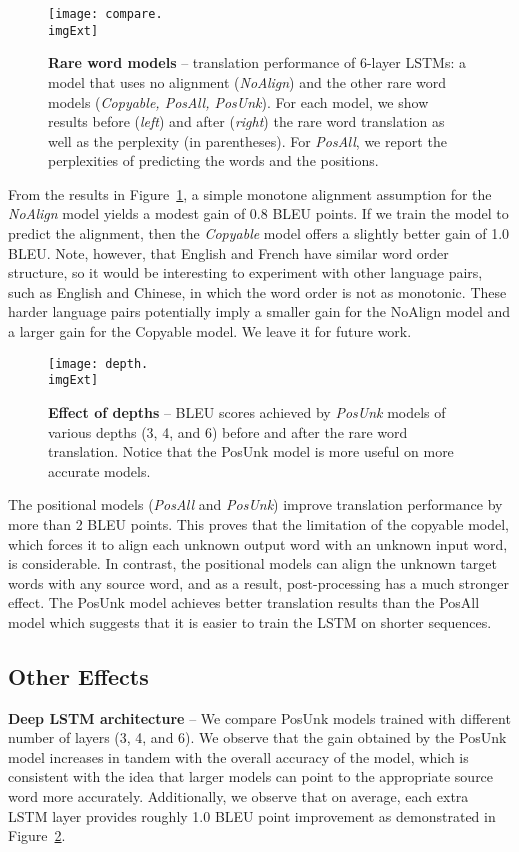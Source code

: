 \documentclass[11pt]{article}
\begin{document}
\begin{figure}
\centering
\texttt{[image: compare.\\imgExt]} \caption{{\bf Rare word models} -- 
translation performance of 6-layer LSTMs:
a model that uses no alignment ({\it NoAlign}) 
and the other rare word models ({\it Copyable, PosAll, PosUnk}). 
For each model, we show results before ({\it left}) and after ({\it right}) the rare word translation as well as the perplexity (in parentheses).
For {\it PosAll}, we report the perplexities of predicting the words and the positions.} 
\label{f:compare}
\end{figure}

 
From the results in Figure~\ref{f:compare}, a simple monotone
alignment assumption for the {\it NoAlign} model yields a modest gain of
0.8 BLEU points. If we train the model to predict the alignment, then the {\it Copyable} model
offers a slightly better gain of 1.0 BLEU. Note, however, that English
and French have similar word order structure, so it would be
interesting to experiment with other language pairs, such as English and
Chinese, in which the word order is not as monotonic. These harder language pairs 
potentially imply a smaller gain for the NoAlign model and a larger
gain for the Copyable model. 
We leave it for future work.

\begin{figure}[tbh!]
\centering
\texttt{[image: depth.\\imgExt]} \caption{{\bf Effect of depths} -- BLEU scores achieved by {\it PosUnk} models of various depths (3, 4, and 6) before and after the rare word translation. 
 Notice that the PosUnk model is more useful on more accurate models. }
\label{f:depth}
\end{figure}

The positional models ({\it PosAll} and {\it PosUnk}) 
improve translation performance by more than 2 BLEU points. 
This proves that the limitation of the copyable model, which forces
it to align each unknown output word with an unknown input word, is considerable.  
In contrast, the positional models can align the unknown target words with any source word,
and as a result, post-processing has a much stronger effect. 
The PosUnk model achieves better translation results than
the PosAll model which suggests that it is easier to train the LSTM on shorter sequences. 

\subsection{Other Effects}
\label{subsec:effects}
{\bf Deep LSTM architecture} --  We compare PosUnk models trained with different number of layers (3, 4, and 6). 
We observe that the gain obtained by the PosUnk model increases in tandem with the overall accuracy of the model, which is consistent 
with the idea that larger models can point to the appropriate source word more accurately.
Additionally, we observe that on average, each extra LSTM layer provides roughly 1.0 BLEU point improvement as demonstrated in Figure~\ref{f:depth}. 
\end{document}
